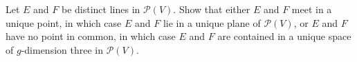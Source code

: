 Let $E$ and $F$ be distinct lines in $\mathcal{P}(V)$. Show that either $E$ and $F$ meet in a unique point, in which case $E$ and $F$ lie in a unique plane of $\mathcal{P}(V)$, or $E$ and $F$ have no point in common, in which case $E$ and $F$ are contained in a unique space of $g$-dimension three in $\mathcal{P}(V)$.
